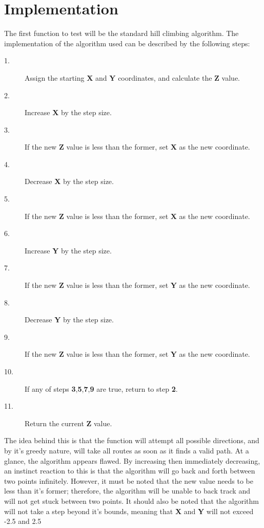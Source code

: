 \documentclass[]{report}
\begin{document}
	\section{Implementation}
	The first function to test will be the standard hill climbing algorithm. The implementation of the algorithm used can be described by the following steps:
	\begin{description}
		\item[1.] Assign the starting \textbf{X} and \textbf{Y} coordinates, and calculate the \textbf{Z} value.
		\item[2.] Increase \textbf{X} by the step size.
		\item[3.] If the new \textbf{Z} value is less than the former, set \textbf{X} as the new coordinate.
		\item[4.] Decrease \textbf{X} by the step size.
		\item[5.] If the new \textbf{Z} value is less than the former, set \textbf{X} as the new coordinate.
		\item[6.] Increase \textbf{Y} by the step size.
		\item[7.] If the new \textbf{Z} value is less than the former, set \textbf{Y} as the new coordinate.
		\item[8.] Decrease \textbf{Y} by the step size.
		\item[9.] If the new \textbf{Z} value is less than the former, set \textbf{Y} as the new coordinate.
		\item[10.] If any of steps \textbf{3},\textbf{5},\textbf{7},\textbf{9} are true, return to step \textbf{2}.
		\item[11.] Return the current \textbf{Z} value.	
	\end{description}
	The idea behind this is that the function will attempt all possible directions, and by it's greedy nature, will take all routes as soon as it finds a valid path. At a glance, the algorithm appears flawed. By increasing then immediately decreasing, an instinct reaction to this is that the algorithm will go back and forth between two points infinitely. However, it must be noted that the new value needs to be less than it's former; therefore, the algorithm will be unable to back track and will not get stuck between two points. It should also be noted that the algorithm will not take a step beyond it's bounds, meaning that \textbf{X} and \textbf{Y} will not exceed -2.5 and 2.5
\end{document}
